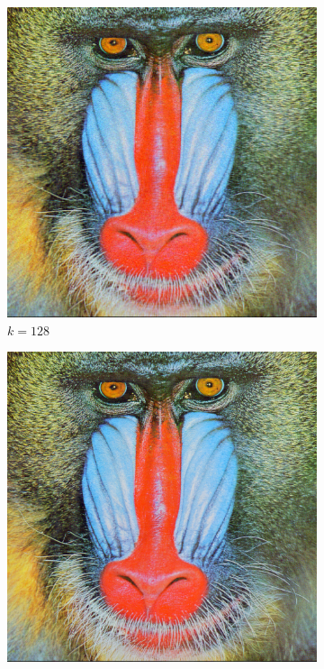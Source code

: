 \documentclass[brazilian,a4paper,twocolumn]{article}
\begin{document}
        \begin{figure}[h]
            \centering
            \begin{subfigure}{0.27\textwidth}
                \includegraphics[width=\textwidth,keepaspectratio]{baboon-128}
                \caption{$k=128$}
                \label{fig:baboon-128}
            \end{subfigure}
            \begin{subfigure}{0.27\textwidth}
                \includegraphics[width=\textwidth,keepaspectratio]{baboon}

\end{subfigure}
\end{figure}
\end{document}
